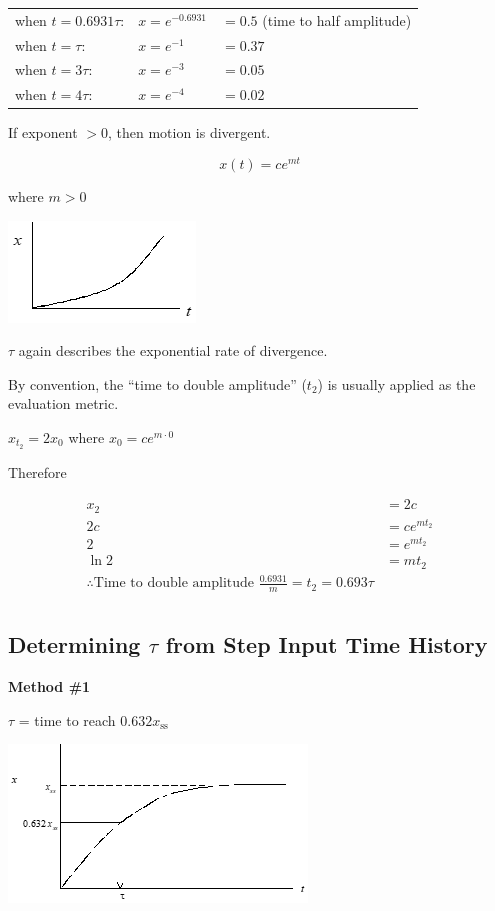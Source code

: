 \documentclass[
]{book}
\begin{document}
\begin{longtable}[]{@{}lll@{}}
\toprule
\endhead
when \(t = 0.6931\tau\): & \(x = e^{−0.6931}\) & \(= 0.5\) (time to half amplitude)\tabularnewline
when \(t = \tau\): & \(x = e^{−1}\) & \(= 0.37\)\tabularnewline
when \(t = 3\tau\):~~~~ & \(x = e^{−3}\) & \(= 0.05\)\tabularnewline
when \(t = 4\tau\): & \(x = e^{−4}\) & \(= 0.02\)\tabularnewline
\bottomrule
\end{longtable}

If exponent \(> 0\), then motion is divergent.

\[x(t) = ce^{mt}\]

where \(m > 0\)

\includegraphics{media/08/image15.png}

\(\tau\) again describes the exponential rate of divergence.

By convention, the ``time to double amplitude'' (\(t_2\)) is usually applied as the evaluation metric.

\(x_{t_2} = 2x_0\) where \(x_0 = ce^{m\cdot 0}\)

Therefore

\begin{align}
x_2 &= 2c \\
2c &= ce^{mt_2} \\
2 &= e^{mt_2} \\
\ln 2 &= mt_2 \\
\therefore \text{Time to double amplitude } \frac{0.6931}{m} = t_2 = 0.693\tau \\
\end{align}

\hypertarget{determining-tau-from-step-input-time-history}{%
\subsection{\texorpdfstring{Determining \(\tau\) from Step Input Time History}{Determining \textbackslash tau from Step Input Time History}}\label{determining-tau-from-step-input-time-history}}

\textbf{Method \#1}

\(\tau\) = time to reach \(0.632 x_{\mathrm{ss}}\)

\includegraphics{media/08/image18.png}
\end{document}
